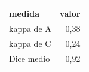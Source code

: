 \begin{tabular}{lr}
\toprule
medida & valor \\
\midrule
kappa de A & 0{,}38 \\
kappa de C & 0{,}24 \\
Dice medio & 0{,}92 \\
\bottomrule
\end{tabular}

